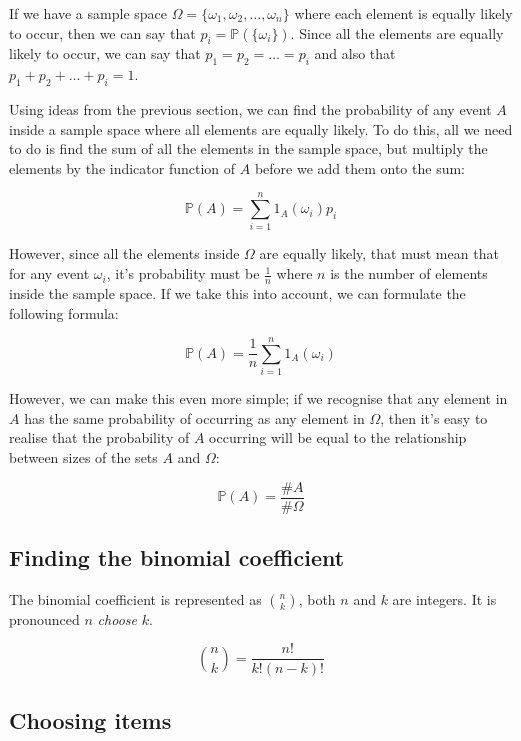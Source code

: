 If we have a sample space $\Omega = \{ \omega_1, \omega_2, \dots, \omega_n \}$
where each element is equally likely to occur, then we can say that $p_i =
\mathbb{P}(\{\omega_i\})$. Since all the elements are equally likely to occur,
we can say that $p_1 = p_2 = \dots = p_i$ and also that $p_1 + p_2 + \dots + p_i
= 1$.

Using ideas from the previous section, we can find the probability of any event
$A$ inside a sample space where all elements are equally likely. To do this, all
we need to do is find the sum of all the elements in the sample space, but
multiply the elements by the indicator function of $A$ before we add them onto
the sum:

\begin{dmath}
	\mathbb{P}(A) = \sum\limits_{i=1}^{n} 1_A(\omega_i)p_i
\end{dmath}

However, since all the elements inside $\Omega$ are equally likely, that must
mean that for any event $\omega_i$, it's probability must be $\frac{1}{n}$ where
$n$ is the number of elements inside the sample space. If we take this into
account, we can formulate the following formula:

\begin{dmath}
	\mathbb{P}(A) = \frac{1}{n}\sum\limits_{i=1}^{n} 1_A(\omega_i)
\end{dmath}


However, we can make this even more simple; if we recognise that any element in
$A$ has the same probability of occurring as any element in $\Omega$, then it's
easy to realise that the probability of $A$ occurring will be equal to the
relationship between sizes of the sets $A$ and $\Omega$:

\begin{dmath}
	\mathbb{P}(A) = \frac{\#A}{\#\Omega}
\end{dmath}

\subsection{Finding the binomial coefficient}

The binomial coefficient is represented as $n \choose k$, both $n$ and $k$ are
integers. It is pronounced $n$ {\it choose} $k$.

\begin{dmath}
	{n \choose k} = \frac{n!}{k!(n-k)!}
\end{dmath}

\subsection{Choosing items}

